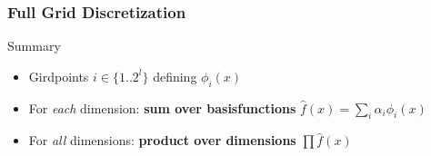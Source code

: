 \begin{frame}
  \frametitle{Full Grid Discretization}
  \topline
  \vspace{-10px}
  \begin{block}{Summary}
    \begin{itemize}
      \item Girdpoints $i \in \{1..2^l\}$ defining $\phi_i(x)$
        \vspace{5px}
      \item For \emph{each} dimension: \textbf{sum over basisfunctions} $\hat{f}(x) = \sum_i{\alpha_i \phi_i(x)}$
        \vspace{5px}
      \item For \emph{all} dimensions: \textbf{product over dimensions} $\prod{\hat{f}(x)}$
    \end{itemize}

  \end{block}
\end{frame}

